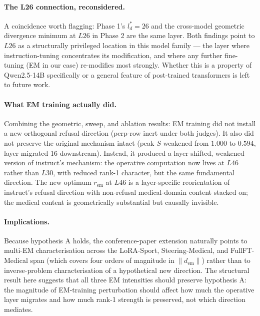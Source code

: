 \paragraph{The L26 connection, reconsidered.}
A coincidence worth flagging: Phase 1's $l^*_d = 26$ and the
cross-model geometric divergence minimum at $L26$ in Phase 2 are the
same layer. Both findings point to $L26$ as a structurally
privileged location in this model family --- the layer where
instruction-tuning concentrates its modification, and where any
further fine-tuning (EM in our case) re-modifies most strongly.
Whether this is a property of Qwen2.5-14B specifically or a general
feature of post-trained transformers is left to future work.

\paragraph{What EM training actually did.}
Combining the geometric, sweep, and ablation results: EM training
did not install a new orthogonal refusal direction (perp-row inert
under both judges). It also did not preserve the original mechanism
intact (peak $S$ weakened from $1.000$ to $0.594$, layer migrated
16 downstream). Instead, it produced a layer-shifted, weakened
version of instruct's mechanism: the operative computation now lives
at $L46$ rather than $L30$, with reduced rank-1 character, but the
same fundamental direction. The new optimum $r_{\text{em}}$ at $L46$
is a layer-specific reorientation of instruct's refusal direction
with non-refusal medical-domain content stacked on; the medical
content is geometrically substantial but causally invisible.

\paragraph{Implications.}
Because hypothesis A holds, the conference-paper extension naturally
points to multi-EM characterisation across the LoRA-Sport,
Steering-Medical, and FullFT-Medical span (which covers four orders
of magnitude in $\|d_{\text{em}}\|$) rather than to inverse-problem
characterisation of a hypothetical new direction. The structural
result here suggests that all three EM intensities should preserve
hypothesis A: the magnitude of EM-training perturbation should
affect how much the operative layer migrates and how much rank-1
strength is preserved, not which direction mediates.

